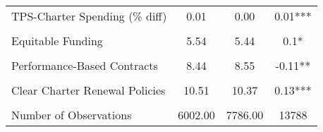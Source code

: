 \begin{table}[!h]
\begin{tabular}[t]{lccc}
TPS-Charter Spending (\% diff) & 0.01 & 0.00 & 0.01***\\
\cellcolor{gray!10}{Total Spending (per-pupil)} & \cellcolor{gray!10}{13697.81} & \cellcolor{gray!10}{14348.39} & \cellcolor{gray!10}{-650.59***}\\
Equitable Funding & 5.54 & 5.44 & 0.1*\\
\cellcolor{gray!10}{No Caps on CS Growth} & \cellcolor{gray!10}{8.59} & \cellcolor{gray!10}{8.44} & \cellcolor{gray!10}{0.15***}\\
Performance-Based Contracts & 8.44 & 8.55 & -0.11**\\
\cellcolor{gray!10}{Transparent Charter Startup Policies} & \cellcolor{gray!10}{8.39} & \cellcolor{gray!10}{8.68} & \cellcolor{gray!10}{-0.29***}\\
Clear Charter Renewal Policies & 10.51 & 10.37 & 0.13***\\
\cellcolor{gray!10}{Exempt from State/District Regs} & \cellcolor{gray!10}{7.21} & \cellcolor{gray!10}{6.93} & \cellcolor{gray!10}{0.28***}\\
\midrule
Number of Observations & 6002.00 & 7786.00 & 13788\\
\bottomrule
\end{tabular}
\end{table}
